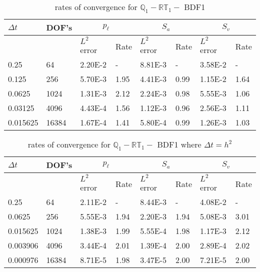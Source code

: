 \begin{table}[ht]
	\centering
	\begin{tabular}{|l|l|l|l|l|l|l|l|}
		\hline
		$\Delta t$ & DOF's & \multicolumn{2}{c|}{$p_{\ell}$} & \multicolumn{2}{c|}{$S_a$} & \multicolumn{2}{c|}{$S_v$}  \\ \hline
		& & $L^2$ error & Rate & $L^2$ error & Rate & $L^2$ error & Rate \\ \hline
		0.25   	& 64    & 2.20E-2 & -	 & 8.81E-3 & -    & 3.58E-2 & - \\ \hline
		0.125   & 256   & 5.70E-3 & 1.95 & 4.41E-3 & 0.99 & 1.15E-2 & 1.64 \\ \hline
		0.0625  & 1024  & 1.31E-3 & 2.12 & 2.24E-3 & 0.98 & 5.55E-3 & 1.06 \\ \hline
		0.03125 & 4096  & 4.43E-4 & 1.56 & 1.12E-3 & 0.96 & 2.56E-3 & 1.11 \\ \hline 
		0.015625& 16384 & 1.67E-4 & 1.41 & 5.80E-4 & 0.99 & 1.26E-3 & 1.03  \\ \hline
	\end{tabular}
	\caption[Template table-description for list of tables.]{ rates of convergence for $\mathbb{Q}_1 - \mathbb{RT}_1 -$ BDF1 } \label{table:template1}
\end{table}


\begin{table}[ht]
	\centering
	\begin{tabular}{|l|l|l|l|l|l|l|l|}
		\hline
		$\Delta t$ & DOF's & \multicolumn{2}{c|}{$p_{\ell}$} & \multicolumn{2}{c|}{$S_a$} & \multicolumn{2}{c|}{$S_v$}  \\ \hline
		& & $L^2$ error & Rate & $L^2$ error & Rate & $L^2$ error & Rate \\ \hline
		0.25   	  & 64    & 2.11E-2 & -	   & 8.44E-3 & -    & 4.08E-2 & - \\ \hline
		0.0625    & 256   & 5.55E-3 & 1.94 & 2.20E-3 & 1.94 & 5.08E-3 & 3.01 \\ \hline
		0.015625  & 1024  & 1.38E-3 & 1.99 & 5.55E-4 & 1.98 & 1.17E-3 & 2.12 \\ \hline
		0.003906  & 4096  & 3.44E-4 & 2.01 & 1.39E-4 & 2.00 & 2.89E-4 & 2.02 \\ \hline 
		0.000976  & 16384 & 8.71E-5 & 1.98 & 3.47E-5 & 2.00 & 7.21E-5 & 2.00  \\ \hline
	\end{tabular}
	\caption[Template table-description for list of tables.]{ rates of convergence for $\mathbb{Q}_1 - \mathbb{RT}_1 -$ BDF1 where $\Delta t = h^2$} \label{table:template}
\end{table}


